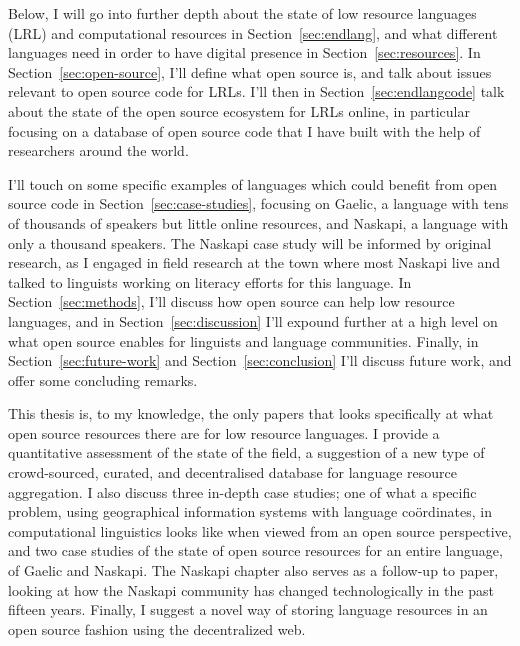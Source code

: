 Below, I will go into further depth about the state of low resource languages (LRL) and computational resources in Section~\ref{sec:endlang}, and what different languages need in order to have digital presence in Section~\ref{sec:resources}. In Section~\ref{sec:open-source}, I'll define what open source is, and talk about issues relevant to open source code for LRLs. I'll then in Section~\ref{sec:endlangcode} talk about the state of the open source ecosystem for LRLs online, in particular focusing on a database of open source code that I have built with the help of researchers around the world.

I'll touch on some specific examples of languages which could benefit from open source code in Section~\ref{sec:case-studies}, focusing on Gaelic, a language with tens of thousands of speakers but little online resources, and Naskapi, a language with only a thousand speakers. The Naskapi case study will be informed by original research, as I engaged in field research at the town where most Naskapi live and talked to linguists working on literacy efforts for this language. In Section~\ref{sec:methods}, I'll discuss how open source can help low resource languages, and in Section~\ref{sec:discussion} I'll expound further at a high level on what open source enables for linguists and language communities. Finally, in Section~\ref{sec:future-work} and Section~\ref{sec:conclusion} I'll discuss future work, and offer some concluding remarks.

This thesis is, to my knowledge, the only papers that looks specifically at what open source resources there are for low resource languages. I provide a quantitative assessment of the state of the field, a suggestion of a new type of crowd-sourced, curated, and decentralised database for language resource aggregation. I also discuss three in-depth case studies; one of what a specific problem, using geographical information systems with language co\"{o}rdinates, in computational linguistics looks like when viewed from an open source perspective, and two case studies of the state of open source resources for an entire language, of Gaelic and Naskapi. The Naskapi chapter also serves as a follow-up to  paper, looking at how the Naskapi community has changed technologically in the past fifteen years. Finally, I suggest a novel way of storing language resources in an open source fashion using the decentralized web.
